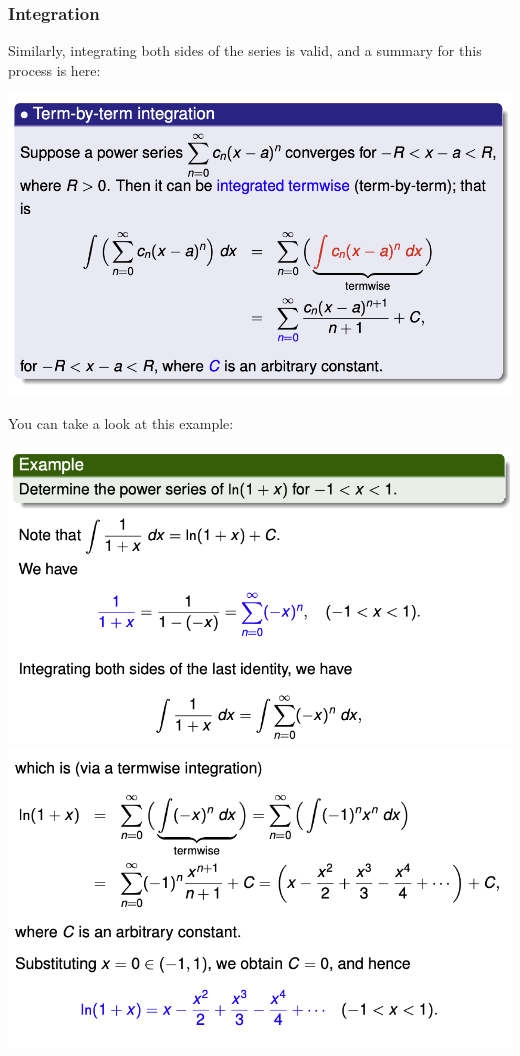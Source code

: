 \documentclass{article}
\begin{document}
\subsubsection{Integration}
Similarly, integrating both sides of the series is valid, and a summary for this process is here:
\begin{center}
        \includegraphics[scale = 0.65]{integration.png}
\end{center}
You can take a look at this example: 
\begin{center}
        \includegraphics[scale = 0.65]{p1-integration-ex.png}
        \includegraphics[scale = 0.65]{p2-integration-ex.png}
\end{center}
\end{document}
